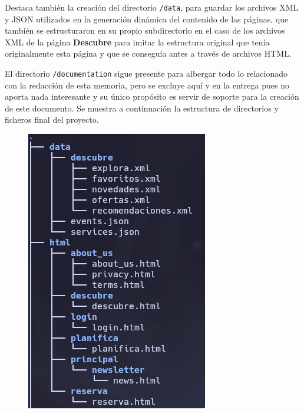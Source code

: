 \documentclass[11pt, a4paper]{book}
\begin{document}
    Destaca también la creación del directorio \texttt{/data}, para guardar los archivos XML y JSON utilizados en la generación dinámica del contenido de las páginas, que también se estructuraron en su propio subdirectorio en el caso de los archivos XML de la página \textbf{Descubre} para imitar la estructura original que tenía originalmente esta página y que se conseguía antes a través de archivos HTML. 

    El directorio \texttt{/documentation} sigue presente para albergar todo lo relacionado con la redacción de esta memoria, pero se excluye aquí y en la entrega pues no aporta nada interesante y su único propósito es servir de soporte para la creación de este documento. Se muestra a continuación la estructura de directorios y ficheros final del proyecto.

	\begin{figure} [h]
		\centering
		\begin{minipage}[c]{0.25\textwidth}
			\centering
			\includegraphics[width=\textwidth]{estructura_ficheros_final1.png}

\end{minipage}
\end{figure}
\end{document}
